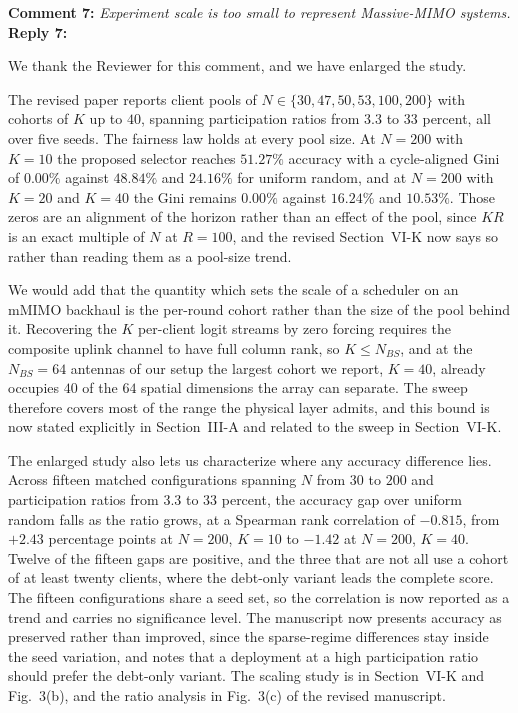 \documentclass[10pt]{article}
\begin{document}
\noindent
\textbf{Comment 7:} \textit{Experiment scale is too small to represent Massive-MIMO systems.} \\
\noindent
\textbf{Reply 7:} {We thank the Reviewer for this comment, and we have enlarged the study.

The revised paper reports client pools of $N \in \{30, 47, 50, 53, 100, 200\}$ with cohorts of $K$ up to $40$, spanning participation ratios from $3.3$ to $33$ percent, all over five seeds. The fairness law holds at every pool size. At $N = 200$ with $K = 10$ the proposed selector reaches $51.27\%$ accuracy with a cycle-aligned Gini of $0.00\%$ against $48.84\%$ and $24.16\%$ for uniform random, and at $N = 200$ with $K = 20$ and $K = 40$ the Gini remains $0.00\%$ against $16.24\%$ and $10.53\%$. Those zeros are an alignment of the horizon rather than an effect of the pool, since $KR$ is an exact multiple of $N$ at $R = 100$, and the revised Section~VI-K now says so rather than reading them as a pool-size trend.

We would add that the quantity which sets the scale of a scheduler on an mMIMO backhaul is the per-round cohort rather than the size of the pool behind it. Recovering the $K$ per-client logit streams by zero forcing requires the composite uplink channel to have full column rank, so $K \le N_{BS}$, and at the $N_{BS} = 64$ antennas of our setup the largest cohort we report, $K = 40$, already occupies $40$ of the $64$ spatial dimensions the array can separate. The sweep therefore covers most of the range the physical layer admits, and this bound is now stated explicitly in Section~III-A and related to the sweep in Section~VI-K.

The enlarged study also lets us characterize where any accuracy difference lies. Across fifteen matched configurations spanning $N$ from $30$ to $200$ and participation ratios from $3.3$ to $33$ percent, the accuracy gap over uniform random falls as the ratio grows, at a Spearman rank correlation of $-0.815$, from $+2.43$ percentage points at $N = 200$, $K = 10$ to $-1.42$ at $N = 200$, $K = 40$. Twelve of the fifteen gaps are positive, and the three that are not all use a cohort of at least twenty clients, where the debt-only variant leads the complete score. The fifteen configurations share a seed set, so the correlation is now reported as a trend and carries no significance level. The manuscript now presents accuracy as preserved rather than improved, since the sparse-regime differences stay inside the seed variation, and notes that a deployment at a high participation ratio should prefer the debt-only variant. The scaling study is in Section~VI-K and Fig.~3(b), and the ratio analysis in Fig.~3(c) of the revised manuscript.}\\
\end{document}
